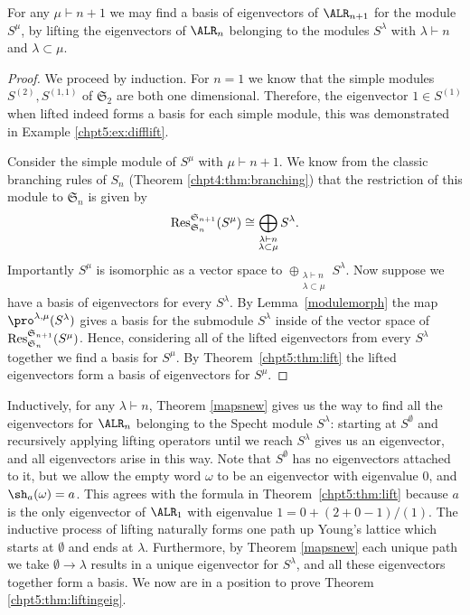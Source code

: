\documentclass[11pt]{report}
\begin{document}
\begin{thm}
	\label{mapsnew}
	For any $\mu \vdash n+1$ we may find a basis of eigenvectors of 
	$\ALR_{n+1}$ 
	for the module $S^{\mu}$, 
	by lifting the eigenvectors of $\ALR_{n}$ belonging to the modules 
	$S^{\lambda}$ with $\lambda\vdash n$ and $\lambda \subset \mu$.
\end{thm}



\begin{proof}
	
	We proceed by induction. For $n=1$ we know that the simple modules 
	$S^{(2)}, S^{(1,1)}$ of $\mathfrak{S}_{2}$ 
	are both one dimensional. Therefore, the eigenvector $1 \in S^{(1)}$ 
	when lifted indeed forms a basis for each simple module, this was demonstrated in Example \ref{chpt5:ex:difflift}.
	
	Consider the simple module of $S^{\mu}$ with $\mu \vdash n+1$. We know  from the classic branching rules of $S_{n}$ (Theorem \ref{chpt4:thm:branching}) that the restriction 
	of this module to $\mathfrak{S}_{n}$ is 
	given by 
	\[\textnormal{Res}^{\mathfrak{S}_{n+1}}_{\mathfrak{S}_{n}}(S^{\mu})\cong
	\bigoplus_{\substack{\lambda
			\vdash n \\\lambda \subset \mu}} S^{\lambda}.\]
	Importantly $S^\mu$ is isomorphic as a vector space to $\oplus_{\substack{\lambda
			\vdash n \\\lambda \subset \mu}} S^{\lambda}$.
	Now suppose we have a basis of eigenvectors for every $S^{\lambda}$. By 
	Lemma~\ref{modulemorph} the map $\pro^{\lambda,\mu}(S^{\lambda})$ 
	gives a basis for the submodule $S^{\lambda}$ inside of the vector space of 
	$\textnormal{Res}^{\mathfrak{S}_{n+1}}_{\mathfrak{S}_{n}}(S^{\mu})$. Hence,
	considering all of the lifted eigenvectors from every $S^{\lambda}$ 
	together we find a basis for $S^{\mu}$. By Theorem~\ref{chpt5:thm:lift} the lifted eigenvectors form a basis of 
	eigenvectors for $S^{\mu}$.
\end{proof}




Inductively, for any $\lambda\vdash n$, Theorem \ref{mapsnew} gives us the 
way to find all 
the eigenvectors for $\ALR_{n}$ belonging to the Specht 
module  $S^{\lambda}$: starting at $S^{\emptyset}$ and recursively applying 
lifting 
operators until we 
reach $S^\lambda$ gives us an eigenvector, and all eigenvectors arise 
in 
this way. 
Note that $S^{\emptyset}$ has no eigenvectors attached to it, but we allow the empty word
$\omega$ to be an eigenvector with eigenvalue $0$, and 
$\sh_{a}(\omega) 
=a$. This agrees with the formula in Theorem~\ref{chpt5:thm:lift} because $a$ 
is the only 
eigenvector of $\ALR_{1}$ with eigenvalue $1 = 0 + (2+0-1)/(1)$.
The inductive process of lifting naturally forms one path up Young's 
lattice which starts at $\emptyset$ and ends at $\lambda$. Furthermore, by 
Theorem 
\ref{mapsnew} each unique path we take  $\emptyset \rightarrow \lambda$ 
results 
in a unique eigenvector for $S^{\lambda}$, and all these eigenvectors 
together form  a basis. We now are in a position to prove Theorem \ref{chpt5:thm:liftingeig}.
\end{document}
